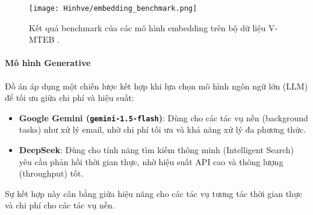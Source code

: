 \begin{figure}[H]
    \centering
    \texttt{[image: Hinhve/embedding\_benchmark.png]}
    \caption{Kết quả benchmark của các mô hình embedding trên bộ dữ liệu V-MTEB \cite{benchmark_vnmteb}.}
    \label{fig:embedding_benchmark}
\end{figure}

\paragraph{Mô hình Generative}
Đồ án áp dụng một chiến lược kết hợp khi lựa chọn mô hình ngôn ngữ lớn (LLM) để tối ưu giữa chi phí và hiệu suất:
\begin{itemize}
    \item \textbf{Google Gemini (\texttt{gemini-1.5-flash})}: Dùng cho các tác vụ nền (background tasks) như xử lý email, nhờ chi phí tối ưu và khả năng xử lý đa phương thức.
    \item \textbf{DeepSeek}: Dùng cho tính năng tìm kiếm thông minh (Intelligent Search) yêu cầu phản hồi thời gian thực, nhờ hiệu suất API cao và thông lượng (throughput) tốt.
\end{itemize}
Sự kết hợp này cân bằng giữa hiệu năng cho các tác vụ tương tác thời gian thực và chi phí cho các tác vụ nền. 